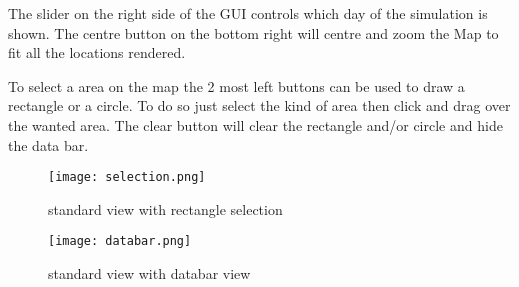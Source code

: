 The slider on the right side of the GUI controls which day of the simulation is shown. The centre button on the bottom right will centre and zoom the Map to fit all the locations rendered.

To select a area on the map the 2 most left buttons can be used to draw a rectangle or a circle. To do so just select the kind of area then click and drag over the wanted area. The clear button will clear the rectangle and/or circle and hide the data bar.


\begin{figure}[H]
  \caption{standard view with rectangle selection}
  \centering
    \texttt{[image: selection.png]}
\end{figure}

\begin{figure}[H]
  \caption{standard view with databar view}
  \centering
    \texttt{[image: databar.png]}
\end{figure}